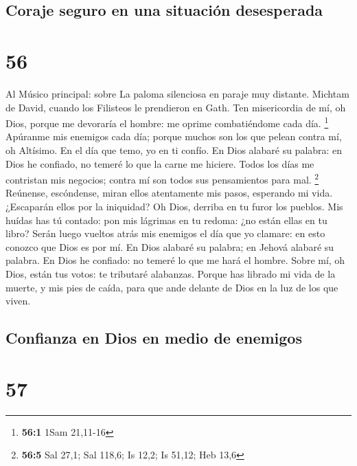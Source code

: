 \hypertarget{coraje-seguro-en-una-situaciuxf3n-desesperada}{%
\subsection{Coraje seguro en una situación
desesperada}\label{coraje-seguro-en-una-situaciuxf3n-desesperada}}

\hypertarget{section-55}{%
\section{56}\label{section-55}}

 Al Músico principal: sobre La paloma silenciosa en paraje
muy distante. Michtam de David, cuando los Filisteos le prendieron en
Gath. Ten misericordia de mí, oh Dios, porque me devoraría el hombre: me
oprime combatiéndome cada día. \footnote{\textbf{56:1} 1Sam 21,11-16}
 Apúranme mis enemigos cada día; porque muchos son los que
pelean contra mí, oh Altísimo.  En el día que temo, yo en ti
confío.  En Dios alabaré su palabra: en Dios he confiado, no
temeré lo que la carne me hiciere.  Todos los días me
contristan mis negocios; contra mí son todos sus pensamientos para mal.
\footnote{\textbf{56:5} Sal 27,1; Sal 118,6; Is 12,2; Is 51,12; Heb 13,6}
 Reúnense, escóndense, miran ellos atentamente mis pasos,
esperando mi vida.  ¿Escaparán ellos por la iniquidad? Oh
Dios, derriba en tu furor los pueblos.  Mis huídas has tú
contado: pon mis lágrimas en tu redoma: ¿no están ellas en tu libro?
 Serán luego vueltos atrás mis enemigos el día que yo
clamare: en esto conozco que Dios es por mí.  En Dios
alabaré su palabra; en Jehová alabaré su palabra.  En Dios
he confiado: no temeré lo que me hará el hombre.  Sobre mí,
oh Dios, están tus votos: te tributaré alabanzas.  Porque
has librado mi vida de la muerte, y mis pies de caída, para que ande
delante de Dios en la luz de los que viven.

\hypertarget{confianza-en-dios-en-medio-de-enemigos}{%
\subsection{Confianza en Dios en medio de
enemigos}\label{confianza-en-dios-en-medio-de-enemigos}}

\hypertarget{section-56}{%
\section{57}\label{section-56}}


